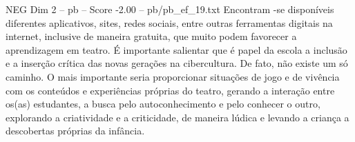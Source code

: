 \begin{textsample}{NEG Dim 2 – pb – Score -2.00 – pb/pb\_ef\_19.txt}
Encontram -se disponíveis diferentes aplicativos, sites, redes sociais, entre outras ferramentas digitais na internet, inclusive de maneira gratuita, que muito podem favorecer a aprendizagem em teatro.
É importante salientar que é papel da escola a inclusão e a inserção crítica das novas gerações na cibercultura.
De fato, não existe um só caminho.
O mais importante seria proporcionar situações de jogo e de vivência com os conteúdos e experiências próprias do teatro, gerando a interação entre os(as) estudantes, a busca pelo autoconhecimento e pelo conhecer o outro, explorando a criatividade e a criticidade, de maneira lúdica e levando a criança a descobertas próprias da infância.

\end{textsample}
